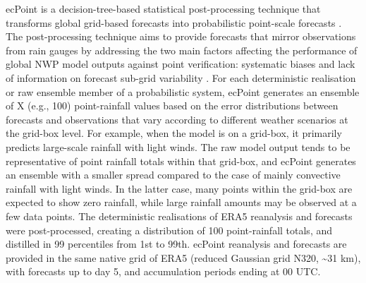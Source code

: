 ecPoint is a decision-tree-based statistical post-processing technique that transforms global grid-based forecasts into probabilistic point-scale forecasts \citep{Hewson_2021}. The post-processing technique aims to provide forecasts that mirror observations from rain gauges by addressing the two main factors affecting the performance of global NWP model outputs against point verification: systematic biases \citep{Lavers_2021} and lack of information on forecast sub-grid variability \citep{Göber_2008}. For each deterministic realisation or raw ensemble member of a probabilistic system, ecPoint generates an ensemble of X (e.g., 100) point-rainfall values based on the error distributions between forecasts and observations that vary according to different weather scenarios at the grid-box level. For example, when the model is on a grid-box, it primarily predicts large-scale rainfall with light winds. The raw model output tends to be representative of point rainfall totals within that grid-box, and ecPoint generates an ensemble with a smaller spread compared to the case of mainly convective rainfall with light winds. In the latter case, many points within the grid-box are expected to show zero rainfall, while large rainfall amounts may be observed at a few data points. The deterministic realisations of ERA5 reanalysis and forecasts were post-processed, creating a distribution of 100 point-rainfall totals, and distilled in 99 percentiles from 1st to 99th. ecPoint reanalysis and forecasts are provided in the same native grid of ERA5 (reduced Gaussian grid N320, \sim31 km), with forecasts up to day 5, and accumulation periods ending at 00 UTC.

